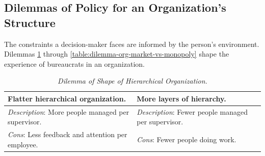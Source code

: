 
\subsection*{Dilemmas of Policy for an Organization's Structure\label{sec:org-dilemma}}


The constraints a decision-maker faces are informed by the person's environment. Dilemmas \ref{table:dilemma-org-people-per-supervisor} through \ref{table:dilemma-org-market-vs-monopoly} shape the experience of bureaucrats in an organization.

\begin{center}
\begin{table}[H] %
\begin{tabular}{ | m{\dilemmatablewidth}| m{\dilemmatablewidth} | } 
  \hline
  \textbf{Flatter hierarchical organization.} &
  \textbf{More layers of hierarchy.} \\ 
  \hline
  \textit{Description}: More people managed per supervisor. & 
  \textit{Description}: Fewer people managed per supervisor. \\ 
  \hline
  \textit{Cons}: Less feedback and attention per employee. & 
  \textit{Cons}: Fewer people doing work. \\  
  \hline
\end{tabular}
\caption{
\textit{Dilemma of Shape of Hierarchical Organization.}
}
\label{table:dilemma-org-people-per-supervisor}
\end{table}
\end{center}



